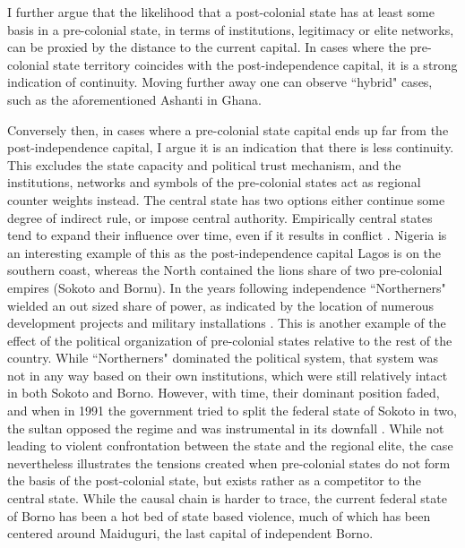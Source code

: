 \documentclass[12pt]{article}
\begin{document}
I further argue that the likelihood that a post-colonial state has at least some
basis in a pre-colonial state, in terms of institutions, legitimacy or elite
networks, can be proxied by the distance to the current capital. In cases where
the pre-colonial state territory coincides with the post-independence capital, it
is a strong indication of continuity. Moving further away one can observe
``hybrid" cases, such as the aforementioned Ashanti in Ghana. 



Conversely then, in cases where a pre-colonial state capital ends up far from
the post-independence capital, I argue it is an indication that there is less
continuity. This excludes the state capacity and political trust mechanism, and
the institutions, networks and symbols of the pre-colonial states act as
regional counter weights instead. The central state has two options either
continue some degree of indirect rule, or impose central authority. Empirically
central states tend to expand their influence over time, even if it results in
conflict \citep{Ying_2020}. Nigeria is an interesting example of this as the
post-independence capital Lagos is on the southern coast, whereas the North
contained the lions share of two pre-colonial empires (Sokoto and
Bornu). In the years following independence ``Northerners" wielded an out sized
share of power, as indicated by the location of numerous development projects
and military installations \citep{Bates2008a}. This is another example of the
effect of the political organization of pre-colonial states relative to the rest
of the country. While ``Northerners" dominated the political system, that system
was not in any way based on their own institutions, which were still relatively
intact in both Sokoto and Borno. However, with time, their dominant position
faded, and when in 1991 the government tried to split the federal state of
Sokoto in two, the sultan opposed the regime and was instrumental in its
downfall \citep{HiribarrenVincent2017AHoB}. While not leading to violent
confrontation between the state and the regional elite, the case nevertheless
illustrates the tensions created when pre-colonial states do not form the basis
of the post-colonial state, but exists rather as a competitor to the central
state. While the causal chain is harder to trace, the current federal state of
Borno has been a hot bed of state based violence, much of which has been
centered around Maiduguri, the last capital of independent Borno.
\end{document}

